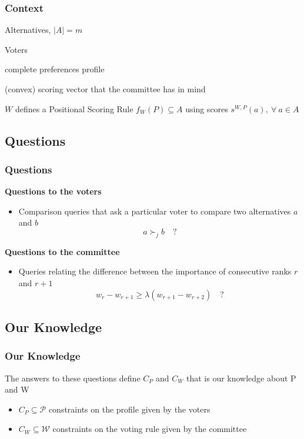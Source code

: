 \documentclass{beamer}
\newcommand{\w}{\bm{w}}
\newcommand{\pref}{\succ}%
\begin{document}
\begin{frame}
	\frametitle{Context}

		\begin{description}[$W=(\w_k,\ 1\leq k \leq m), \ W \in \mathcal{W}$]
			\item [$A$] Alternatives, $|A|=m$
			\item [$N$] Voters 
			\item [$P = (\pref_j, \ j \in N ), \ P \in \mathcal{P} $] complete preferences profile 
			\item [$W=(\w_k,\ 1\leq k \leq m), \ W \in \mathcal{W}$] (convex) scoring vector that the committee has in mind
		\end{description}
		\bigskip
		\begin{block}{}
			$W$ defines a Positional Scoring Rule $f_W(P)\subseteq A$ using scores \color{blue}$s^{W,P}(a), \ \forall \ a \in A$
		\end{block}
		
\end{frame}

\subsection{Questions}
\begin{frame}
	\frametitle{Questions}
	\textbf{Questions to the voters}
	\begin{itemize}
		\item[] Comparison queries that ask a particular voter to compare two alternatives $a$ and $b$
		\color{blue}\[a \pref_j b \quad ?\]
	\end{itemize}
	\textbf{Questions to the committee}
	\begin{itemize}
		\item[] Queries relating the difference between the importance of consecutive ranks $r$ and $r+1$
		\color{blue} \[ w_{r} - w_{r+1} \geq \lambda (w_{r+1} - w_{r+2}) \quad ? \] 
	\end{itemize}
\end{frame}

\subsection{Our Knowledge}
\begin{frame}
	\frametitle{Our Knowledge}
	The answers to these questions define $C_P$ and $C_W$ that is our knowledge about P and W 
	\medskip
	\begin{itemize}
		\item $C_P \subseteq \mathcal{P}$ constraints on the profile given by the voters
		\item $C_W \subseteq \mathcal{W}$ constraints on the voting rule given by the committee
	\end{itemize}
\end{frame}
\end{document}
